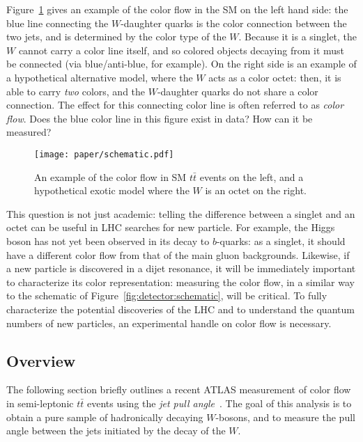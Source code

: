 Figure~\ref{fig:color:motivation:schematic} gives an example of the color flow in the SM on the left hand side: the blue line connecting the $W$-daughter quarks is the color connection between the two jets, and is determined by the color type of the $W$. Because it is a singlet, the $W$ cannot carry a color line itself, and so colored objects decaying from it must be connected (via blue/anti-blue, for example). On the right side is an example of a hypothetical alternative model, where the $W$ acts as a color octet: then, it is able to carry \textit{two} colors, and the $W$-daughter quarks do not share a color connection. The effect for this connecting color line is often referred to as \textit{color flow}. Does the blue color line in this figure exist in data? How can it be measured?


\begin{figure}
\centering
\texttt{[image: paper/schematic.pdf]}
\caption{An example of the color flow in SM $t\bar{t}$ events on the left, and a hypothetical exotic model where the $W$ is an octet on the right.}
\label{fig:color:motivation:schematic}
\end{figure}


This question is not just academic: telling the difference between a singlet and an octet can  be useful in LHC searches for new particle. For example, the Higgs boson has not yet been observed in its decay to $b$-quarks: as a singlet, it should have a different color flow from that of the main gluon backgrounds. Likewise, if a new particle is discovered in a dijet resonance, it will be immediately important to characterize its color representation: measuring the color flow, in a similar way to the schematic of Figure~\ref{fig:detector:schematic}, will be critical. To fully characterize the potential discoveries of the LHC and to understand the quantum numbers of new particles, an experimental handle on color flow is necessary.

\subsection{Overview}

The following section briefly outlines a recent ATLAS measurement of color flow in semi-leptonic $t\bar{t}$ events using the \textit{jet pull angle}~\cite{Aad:2015lxa,Nachman:1728288}. The goal of this analysis is to obtain a pure sample of hadronically decaying $W$-bosons, and to measure the pull angle between the jets initiated by the decay of the $W$. 

